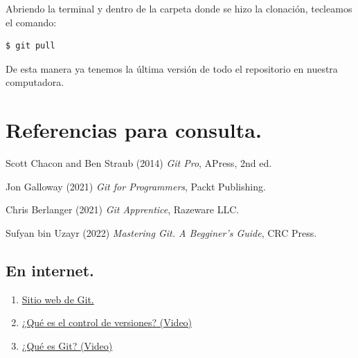 Abriendo la terminal y dentro de la carpeta donde se hizo la clonación, tecleamos el comando:
\begin{verbatim}
$ git pull
\end{verbatim}
    
De esta manera ya tenemos la última versión de todo el repositorio en nuestra computadora.

\section{Referencias para consulta.}


\renewcommand{\refname}{Libros.}

\begin{thebibliography}{9}

Scott Chacon and Ben Straub (2014) \emph{Git Pro}, APress, 2nd ed.
    
Jon Galloway (2021) \emph{Git for Programmers}, Packt Publishing.

Chris Berlanger (2021) \emph{Git Apprentice}, Razeware LLC.

Sufyan bin Uzayr (2022) \emph{Mastering Git. A Begginer's Guide}, CRC Press.

\end{thebibliography}

\subsection*{\Large{En internet.}}

\begin{enumerate}[label=\alph*)]
\item \href{https://git-scm.com/}{Sitio web de Git.}
\item \href{https://git-scm.com/video/what-is-version-control}{¿Qué es el control de versiones? (Video)}
\item \href{https://git-scm.com/video/what-is-git}{¿Qué es Git? (Video)}
 \end{enumerate}



